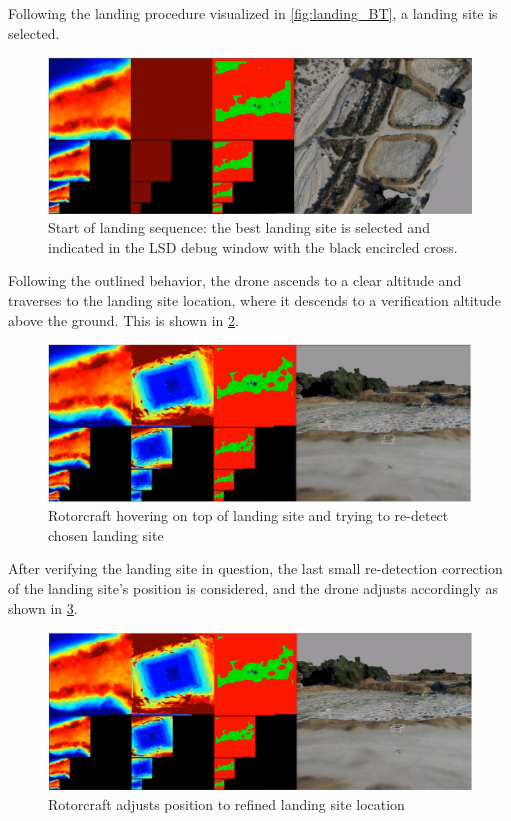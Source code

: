 Following the landing procedure visualized in \cref{fig:landing_BT}, a landing site is selected. 

\begin{figure}[h]
\centering
\includegraphics[scale=0.25]{images/autonomous_landing/demo_flight/ls_selection.png}
\caption{Start of landing sequence: the best landing site is selected and indicated in the LSD debug window with the black encircled cross.}
\label{fig:demo_ls_selection}
\end{figure}

Following the outlined behavior, the drone ascends to a clear altitude and traverses to the landing site location, where it descends to a verification altitude above the ground. This is shown in \cref{fig:demo_ver}.

\begin{figure}[h]
\centering
\includegraphics[scale=0.25]{images/autonomous_landing/demo_flight/verification.png}
\caption{Rotorcraft hovering on top of landing site and trying to re-detect chosen landing site}
\label{fig:demo_ver}
\end{figure}

After verifying the landing site in question, the last small re-detection correction of the landing site's position is considered, and the drone adjusts accordingly as shown in \cref{fig:demo_last_correction}.

\begin{figure}[h]
\centering
\includegraphics[scale=0.25]{images/autonomous_landing/demo_flight/last_correction.png}
\caption{Rotorcraft adjusts position to refined landing site location}
\label{fig:demo_last_correction}
\end{figure}

